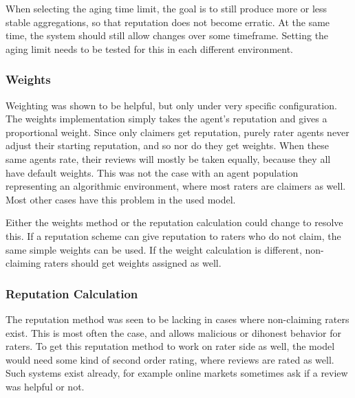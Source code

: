 \documentclass[%
    ]{\PathToTumTemplate/thesis/tum_thesis}
\begin{document}
When selecting the aging time limit, the goal is to still produce more or less stable aggregations, so that reputation does not become erratic.
At the same time, the system should still allow changes over some timeframe.
Setting the aging limit needs to be tested for this in each different environment.

\subsubsection{Weights}
Weighting was shown to be helpful, but only under very specific configuration.
The weights implementation simply takes the agent's reputation and gives a proportional weight.
Since only claimers get reputation, purely rater agents never adjust their starting reputation, and so nor do they get weights.
When these same agents rate, their reviews will mostly be taken equally, because they all have default weights.
This was not the case with an agent population representing an algorithmic environment, where most raters are claimers as well.
Most other cases have this problem in the used model.

Either the weights method or the reputation calculation could change to resolve this.
If a reputation scheme can give reputation to raters who do not claim, the same simple weights can be used.
If the weight calculation is different, non-claiming raters should get weights assigned as well.



\subsubsection{Reputation Calculation}
The reputation method was seen to be lacking in cases where non-claiming raters exist.
This is most often the case, and allows malicious or dihonest behavior for raters.
To get this reputation method to work on rater side as well, the model would need some kind of second order rating, where reviews are rated as well.
Such systems exist already, for example online markets sometimes ask if a review was helpful or not.

\end{document}

